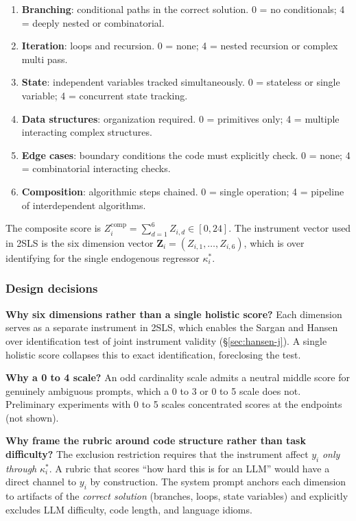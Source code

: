 \documentclass[conference]{IEEEtran}
\begin{document}
\begin{enumerate}
\item \textbf{Branching}: conditional paths in the correct solution. 0 = no conditionals; 4 = deeply nested or combinatorial.
\item \textbf{Iteration}: loops and recursion. 0 = none; 4 = nested recursion or complex multi pass.
\item \textbf{State}: independent variables tracked simultaneously. 0 = stateless or single variable; 4 = concurrent state tracking.
\item \textbf{Data structures}: organization required. 0 = primitives only; 4 = multiple interacting complex structures.
\item \textbf{Edge cases}: boundary conditions the code must explicitly check. 0 = none; 4 = combinatorial interacting checks.
\item \textbf{Composition}: algorithmic steps chained. 0 = single operation; 4 = pipeline of interdependent algorithms.
\end{enumerate}
The composite score is $Z_i^{\text{comp}} = \sum_{d=1}^{6} Z_{i,d} \in [0,24]$. The instrument vector used in 2SLS is the six dimension vector $\mathbf{Z}_i = (Z_{i,1},\ldots,Z_{i,6})$, which is over identifying for the single endogenous regressor $\kappa_i^*$.

\subsubsection{Design decisions}
\textbf{Why six dimensions rather than a single holistic score?} Each dimension serves as a separate instrument in 2SLS, which enables the Sargan and Hansen over identification test of joint instrument validity (\S\ref{sec:hansen-j}). A single holistic score collapses this to exact identification, foreclosing the test.

\textbf{Why a 0 to 4 scale?} An odd cardinality scale admits a neutral middle score for genuinely ambiguous prompts, which a 0 to 3 or 0 to 5 scale does not. Preliminary experiments with 0 to 5 scales concentrated scores at the endpoints (not shown).

\textbf{Why frame the rubric around code structure rather than task difficulty?} The exclusion restriction requires that the instrument affect $y_i$ \emph{only through} $\kappa_i^*$. A rubric that scores ``how hard this is for an LLM'' would have a direct channel to $y_i$ by construction. The system prompt anchors each dimension to artifacts of the \emph{correct solution} (branches, loops, state variables) and explicitly excludes LLM difficulty, code length, and language idioms.
\end{document}
